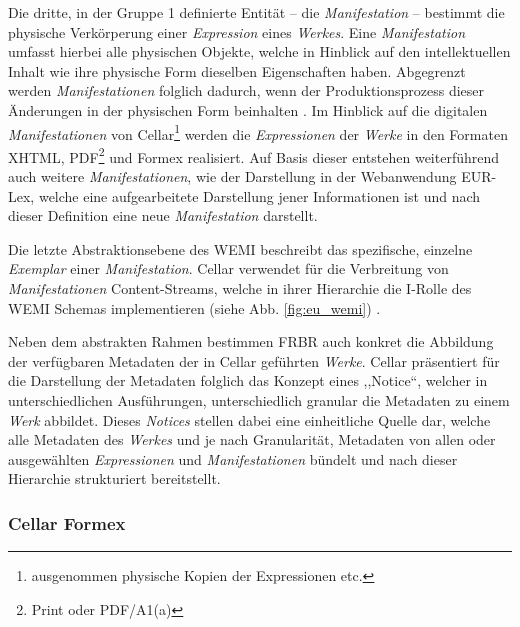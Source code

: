 Die dritte, in der Gruppe 1 definierte Entität -- die \textit{Manifestation} -- bestimmt die physische Verkörperung einer \textit{Expression} eines \textit{Werkes}.
Eine \textit{Manifestation} umfasst hierbei alle physischen Objekte, welche in Hinblick auf den intellektuellen Inhalt wie ihre physische Form dieselben Eigenschaften haben.
Abgegrenzt werden \textit{Manifestationen} folglich dadurch, wenn der Produktionsprozess dieser Änderungen in der physischen Form beinhalten \cite[S. 20f]{eu_frbr}.
Im Hinblick auf die digitalen \textit{Manifestationen} von Cellar\footnote{ausgenommen physische Kopien der Expressionen etc.} werden die \textit{Expressionen} der \textit{Werke} in den Formaten XHTML, PDF\footnote{Print oder PDF/A1(a)} und Formex realisiert. 
Auf Basis dieser entstehen weiterführend auch weitere \textit{Manifestationen}, wie der Darstellung in der Webanwendung EUR-Lex, welche eine aufgearbeitete Darstellung jener Informationen ist und nach dieser Definition eine neue \textit{Manifestation} darstellt.

Die letzte Abstraktionsebene des \acs{WEMI} beschreibt das spezifische, einzelne \textit{Exemplar} einer \textit{Manifestation}. \cite[22]{eu_frbr}
Cellar verwendet für die Verbreitung von \textit{Manifestationen} Content-Streams, welche in ihrer Hierarchie die I-Rolle des \ac{WEMI} Schemas implementieren (siehe Abb. \ref{fig:eu_wemi}) \cite[29]{eu_cellar}. 

Neben dem abstrakten Rahmen bestimmen \acs{FRBR} auch konkret die Abbildung der verfügbaren Metadaten der in Cellar geführten \textit{Werke}.
Cellar präsentiert für die Darstellung der Metadaten folglich das Konzept eines ,,Notice``, welcher in unterschiedlichen Ausführungen, unterschiedlich granular die Metadaten zu einem \textit{Werk} abbildet.
Dieses \textit{Notices} stellen dabei eine einheitliche Quelle dar, welche alle Metadaten des \textit{Werkes} und je nach Granularität, Metadaten von allen oder ausgewählten \textit{Expressionen} und \textit{Manifestationen} bündelt und nach dieser Hierarchie strukturiert bereitstellt.
\cite[S. 31f]{eu_cellar}

\pagebreak
    \subsubsection{Cellar Formex}

